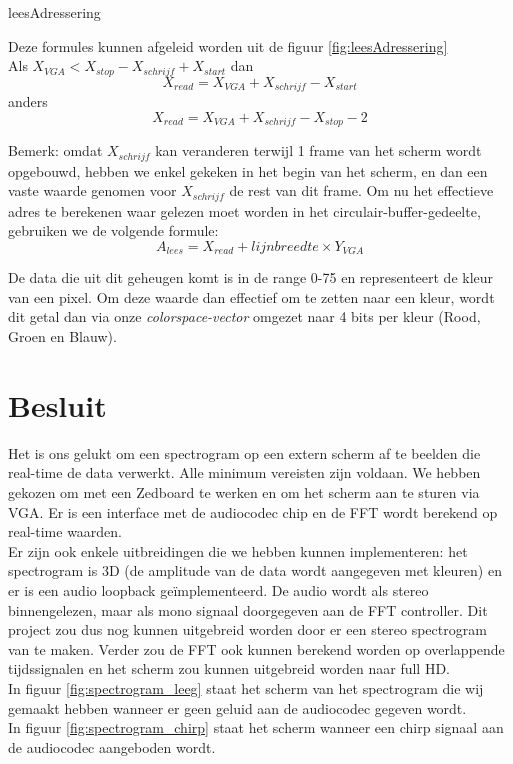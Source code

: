 \documentclass[a4paper,kul]{kulakarticle} %
\begin{document}
\begin{itemize}
leesAdressering

	Deze formules kunnen afgeleid worden uit de figuur \ref{fig:leesAdressering}
	\\
	
	Als $X_{VGA} < X_{stop} - X_{schrijf} + X_{start}$ dan 
	$$X_{read} = X_{VGA} + X_{schrijf} - X_{start}$$
	anders
	$$X_{read} = X_{VGA} + X_{schrijf} - X_{stop} - 2$$
	
	
	Bemerk: omdat $X_{schrijf}$ kan veranderen terwijl 1 frame van het scherm wordt opgebouwd, hebben we enkel gekeken in het begin van het scherm, en dan een vaste waarde genomen voor $X_{schrijf}$ de rest van dit frame. Om nu het effectieve adres te berekenen waar gelezen moet worden in het circulair-buffer-gedeelte, gebruiken we de volgende formule:
	$$ A_{lees} = X_{read} + lijnbreedte \times Y_{VGA} $$
	
	De data die uit dit geheugen komt is in de range 0-75 en representeert de kleur van een pixel. Om deze waarde dan effectief om te zetten naar een kleur, wordt dit getal dan via onze \textit{colorspace-vector} omgezet naar 4 bits per kleur (Rood, Groen en Blauw).

\end{itemize}

\section{Besluit}

Het is ons gelukt om een spectrogram op een extern scherm af te beelden die real-time de data verwerkt. Alle minimum vereisten zijn voldaan. We hebben gekozen om met een Zedboard te werken en om het scherm aan te sturen via VGA. Er is een interface met de audiocodec chip en de FFT wordt berekend op real-time waarden.\\

Er zijn ook enkele uitbreidingen die we hebben kunnen implementeren: het spectrogram is 3D (de amplitude van de data wordt aangegeven met kleuren) en er is een audio loopback geïmplementeerd. De audio wordt als stereo binnengelezen, maar als mono signaal doorgegeven aan de FFT controller. Dit project zou dus nog kunnen uitgebreid worden door er een stereo spectrogram van te maken. Verder zou de FFT ook kunnen berekend worden op overlappende tijdssignalen en het scherm zou kunnen uitgebreid worden naar full HD.\\

In figuur \ref{fig:spectrogram_leeg} staat het scherm van het spectrogram die wij gemaakt hebben wanneer er geen geluid aan de audiocodec gegeven wordt. \\
In figuur \ref{fig:spectrogram_chirp} staat het scherm wanneer een chirp signaal aan de audiocodec aangeboden wordt.
\end{document}
